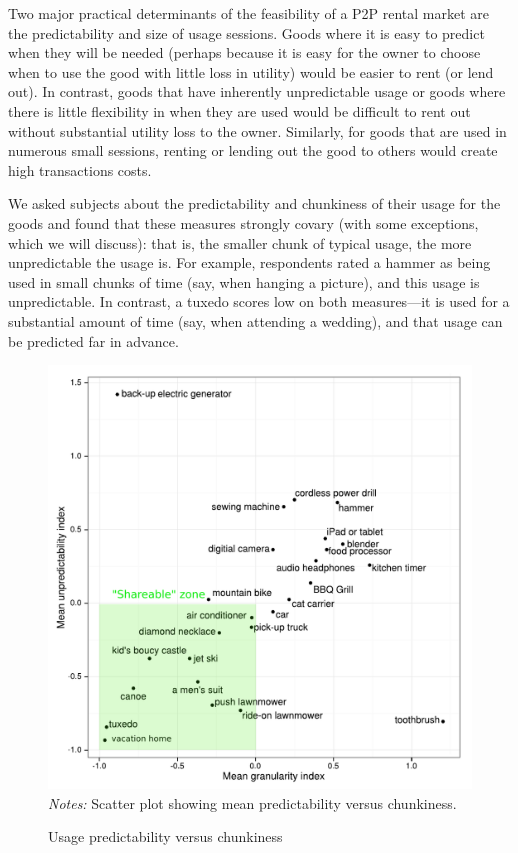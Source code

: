 \documentclass[11pt]{article}
\begin{document}
Two major practical determinants of the feasibility of a P2P rental market are the predictability and size of usage sessions. 
Goods where it is easy to predict when they will be needed (perhaps because it is easy for the owner to choose when to use the good with little loss in utility) would be easier to rent (or lend out).
In contrast, goods that have inherently unpredictable usage or goods where there is little flexibility in when they are used would be difficult to rent out without substantial utility loss to the owner.
Similarly, for goods that are used in numerous small sessions, renting or lending out the good to others would create high transactions costs.

We asked subjects about the predictability and chunkiness of their usage for the goods and found that these measures strongly covary (with some exceptions, which we will discuss):
that is, the smaller chunk of typical usage, the more unpredictable the usage is.
For example, respondents rated a hammer as being used in small chunks of time (say, when hanging a picture), and this usage is unpredictable. 
In contrast, a tuxedo scores low on both measures---it is used for a substantial amount of time (say, when attending a wedding), and that usage can be predicted far in advance.  

\begin{figure}
\centering 
\caption{Usage predictability versus chunkiness \label{fig:granularity_v_predictability}}
\begin{minipage}{0.60 \linewidth}
\includegraphics[width = \linewidth]{./plots/granularity_versus_predictability.pdf} 
\emph{Notes:} Scatter plot showing mean predictability versus chunkiness. 
\end{minipage} 
\end{figure} 
\end{document}
